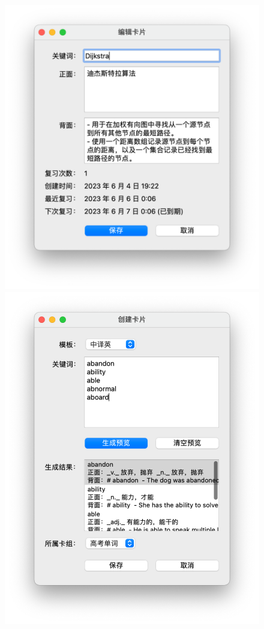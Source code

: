 \documentclass[12pt]{article}
\begin{document}
\begin{figure}[p]
  \includegraphics[scale=0.44]{fig/screenshot-editor.pdf}
  \includegraphics[scale=0.44]{fig/screenshot-composer.pdf}

\end{figure}
\end{document}
